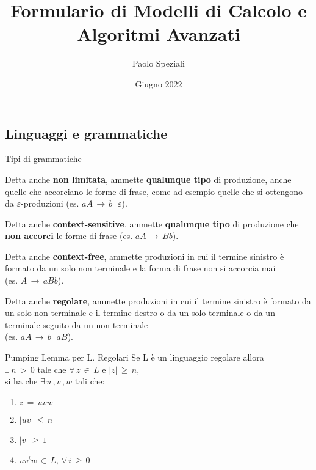 \documentclass[10pt,a4paper]{article}
\title{Formulario di Modelli di Calcolo e Algoritmi Avanzati}
\author{Paolo Speziali}
\date{Giugno 2022}
\begin{document}
\small
\begin{multicols}{3}

\maketitle
\thispagestyle{empty}


\section{Linguaggi e grammatiche}


\begin{textbox}{Tipi di grammatiche}

Detta anche \textbf{non limitata}, ammette \textbf{qualunque tipo}
di produzione, anche quelle che accorciano le forme di
frase, come ad esempio quelle che si ottengono da \(\varepsilon\)-produzioni
(es. \(aA\,\rightarrow\,b\,|\,\varepsilon\)).

Detta anche \textbf{context-sensitive}, ammette \textbf{qualunque tipo}
di produzione che \textbf{non accorci} le forme di frase
(es. \(aA\,\rightarrow\,Bb\)).

Detta anche \textbf{context-free}, ammette produzioni in cui
il termine sinistro è formato da un solo non terminale
e la forma di frase non si accorcia mai \\
(es. \(A\,\rightarrow\,aBb\)).

Detta anche \textbf{regolare}, ammette produzioni in cui
il termine sinistro è formato da un solo non terminale
e il termine destro o da un solo terminale o da un
terminale seguito da un non terminale\\
(es. \(aA\,\rightarrow\,b\,|\,aB\)).

\end{textbox}


\begin{textbox}{Pumping Lemma per L. Regolari}
Se L è un linguaggio regolare allora \\
\(\exists \, n \, > \, 0\) tale che \(\forall \, z \, \in \, L \) e
\(|z| \, \geq \, n\),\\si ha che
\(\exists \, u \, ,v \, ,w\) tali che:
\begin{enumerate}[leftmargin=*]
    \item \(z\, =\, uvw\)
    \item \(|uv|\, \leq\,  n\)
    \item \(|v|\, \geq\,  1\)
    \item \(uv^iw\,\in\,L,\,\forall\,i\,\geq\,0\)
\end{enumerate}


\end{textbox}
\end{multicols}
\end{document}
